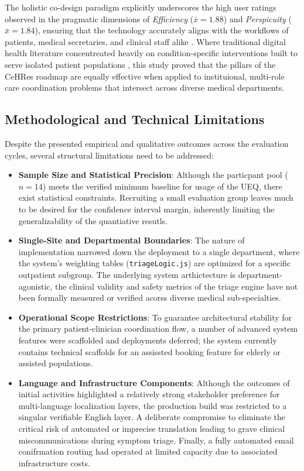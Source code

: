 \documentclass[manuscript, screen, review]{acmart}
\begin{document}
The holistic co-design paradigm explicitly underscores the high user ratings observed in the pragmatic dimensions of \textit{Efficiency} ($\bar{x}=1.88$) and \textit{Perspicuity} ($\bar{x}=1.84$), ensuring that the technology accurately aligns with the workflows of patients, medical secretaries, and clinical staff alike \cite{laugwitz_2008_construction,schrepp_2023_user}. Where traditional digital health literature concentreated heavily on condition-specific interventions built to serve isolated patient populations \cite{landeiro_2025_humancentered,woodard_2018_the}, this study proved that the pillars of the CeHRes roadmap are equally effective when applied to instituional, multi-role care coordination problems that intersect across diverse medical departments. 
\subsection{Methodological and Technical Limitations}
\label{sub:limitations}
Despite the presented empirical and qualitative outcomes across the evaluation cycles, several structural limitations need to be addressed: 
\begin{itemize}
  \item \textbf{Sample Size and Statistical Precision}: Although the particpant pool ($n=14$) meets the verified minimum baseline for usage of the UEQ, there exist statistical constraints. Recruiting a small evaluation group leaves much to be desired for the confidence interval margin, inherently limiting the generalizability of the quantiative resutls.
  \item \textbf{Single-Site and Departmental Boundaries}: The nature of implementation narrowed down the deployment to a single department, where the system's weighting tables (\texttt{triageLogic.js}) are optimized for a specific outpatient subgroup. The underlying system arthictecture is department-agonistic, the clinical validity and safety metrics of the triage engine have not been formally measured or verified acorss diverse medical sub-specialties. 
  \item \textbf{Operational Scope Restrictions}: To guarantee architectural stability for the primary patient-clinician coordination flow, a number of advanced system features were scaffolded and deployments deferred; the system currently contains technical scaffolds for an assissted booking feature for elderly or assisted populations. 
  \item \textbf{Language and Infrastructure Components}: Although the outcomes of initial activities highlighted a relatively strong stakeholder preference for multi-language localization layers, the production build was restricted to a singular verifiable English layer. A deliberate compromise to eliminate the critical risk of automated or imprecise translation leading to grave clinical miscommunications during symptom triage. Finally, a fully automated email conifrmation routing had operated at limited capacity due to associated infrastructure costs. 
\end{itemize}
\end{document}
